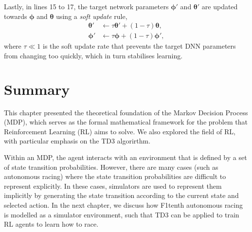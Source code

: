 Lastly, in lines 15 to 17, the target network parameters $\bm{\phi}'$ and $\bm{\theta}'$ are updated towards $\bm{\phi}$ and $\bm{\theta}$ using a \emph{soft update} rule, 
\begin{equation}
\begin{split}
    \bm{\theta}' &\leftarrow \tau \bm{\theta}' + (1 - \tau) \bm{\theta}, \\
    \bm{\phi}' &\leftarrow \tau \bm{\phi} + (1 - \tau) \bm{\phi}',
\end{split}
\end{equation}
where $\tau \ll 1$ is the soft update rate that prevents the target DNN parameters from changing too quickly, which in turn stabilises learning. 



\section{Summary}

This chapter presented the theoretical foundation of the Markov Decision Process (MDP), which serves as the formal mathematical framework for the problem that Reinforcement Learning (RL) aims to solve.
We also explored the field of RL, with particular emphasis on the TD3 algorirthm.
 

Within an MDP, the agent interacts with an environment that is defined by a set of state transition probabilities. 
However, there are many cases (such as autonomous racing) where the state transition probabilities are difficult to represent explicitly.
In these cases, simulators are used to represent them implicitly by generating the state transition according to the current state and selected action.
In the next chapter, we discuss how F1tenth autonomous racing is modelled as a simulator environment, 
such that TD3 can be applied to train RL agents to learn how to race.



